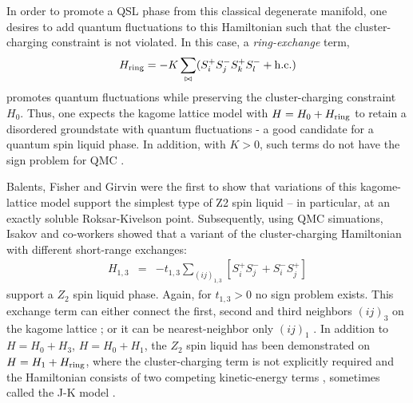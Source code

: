 \documentclass[range]{ar2e}
\begin{document}
In order to promote a QSL phase from this classical degenerate manifold, one desires to add quantum fluctuations to this Hamiltonian such that the cluster-charging constraint is not violated.  In this case, a {\it ring-exchange} term, 
\begin{eqnarray}
H_{\rm ring} = -K \sum_{\bowtie} ( S_i^{+} S_j^{-} S_k^{+} S_l^{-} + {\rm h.c.} )
\end{eqnarray} 
promotes quantum fluctuations while preserving the cluster-charging constraint $H_0$.  Thus, one expects the kagome lattice model with $H = H_0 + H_{\rm ring}$ to retain a disordered groundstate with quantum fluctuations - a good candidate for a quantum spin liquid phase.  In addition, with $K>0$, such terms do not have the sign problem for QMC \cite{JKqmc}.

Balents, Fisher and Girvin \cite{BFG} were the first to show that variations of this kagome-lattice model support the simplest type of Z2 spin liquid -- in particular, at an exactly soluble Roksar-Kivelson point.  Subsequently, using QMC simuations, Isakov and co-workers showed that a variant of the cluster-charging Hamiltonian with different short-range exchanges: 
\begin{eqnarray}
H_{1,3} &=& -t_{1,3} \sum_{( ij )_{1,3}} [S^{+}_i S^-_j + S^-_i S^{+}_j]  
\end{eqnarray}
support a $Z_2$ spin liquid phase.  Again, for $t_{1,3}>0$ no sign problem exists.  This exchange term can either connect the first, second and third neighbors $( ij )_3$ on the kagome lattice \cite{Isakov1,Isakov2}; or it can be nearest-neighbor only $( ij )_1$ \cite{TopoEE}.  
In addition to  $H = H_0 + H_3$, $H = H_0 + H_1$, the $Z_2$ spin liquid has been demonstrated on $H = H_1 + H_{\rm ring}$, where the cluster-charging term is not explicitly required and the Hamiltonian consists of two competing kinetic-energy terms \cite{Long}, sometimes called the J-K model \cite{JKqmc}.

\end{document}
